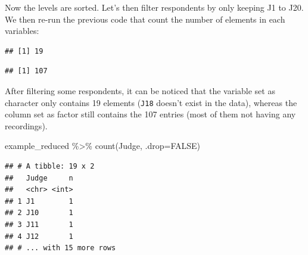 \documentclass[
]{krantz}
\makeatletter
\newenvironment{Shaded}{\begin{snugshade}}{\end{snugshade}}
\newcommand{\AttributeTok}[1]{\textcolor[rgb]{0.61,0.61,0.61}{#1}}
\newcommand{\CommentTok}[1]{\textcolor[rgb]{0.37,0.37,0.37}{\textit{#1}}}
\newcommand{\ConstantTok}[1]{\textcolor[rgb]{0,0,0}{#1}}
\newcommand{\DecValTok}[1]{\textcolor[rgb]{0.06,0.06,0.06}{#1}}
\newcommand{\FunctionTok}[1]{\textcolor[rgb]{0,0,0}{#1}}
\newcommand{\NormalTok}[1]{#1}
\newcommand{\OtherTok}[1]{\textcolor[rgb]{0.37,0.37,0.37}{#1}}
\newcommand{\SpecialCharTok}[1]{\textcolor[rgb]{0,0,0}{#1}}
\newcommand{\StringTok}[1]{\textcolor[rgb]{0.5,0.5,0.5}{#1}}
\newenvironment{kframe}{%
\medskip{}
\setlength{\fboxsep}{.8em}
 \def\at@end@of@kframe{}%
 \ifinner\ifhmode%
  \def\at@end@of@kframe{\end{minipage}}%
  \begin{minipage}{\columnwidth}%
 \fi\fi%
 \def\FrameCommand##1{\hskip\@totalleftmargin \hskip-\fboxsep
 \colorbox{shadecolor}{##1}\hskip-\fboxsep
     \hskip-\linewidth \hskip-\@totalleftmargin \hskip\columnwidth}%
 \MakeFramed {\advance\hsize-\width
   \@totalleftmargin\z@ \linewidth\hsize
   \@setminipage}}%
 {\par\unskip\endMakeFramed%
 \at@end@of@kframe}
\renewenvironment{Shaded}{\begin{kframe}}{\end{kframe}}
\makeatother
\begin{document}
Now the levels are sorted. Let's then filter respondents by only keeping J1 to J20. We then re-run the previous code that count the number of elements in each variables:

\begin{Shaded}
\end{Shaded}

\begin{verbatim}
## [1] 19
\end{verbatim}

\begin{Shaded}
\end{Shaded}

\begin{verbatim}
## [1] 107
\end{verbatim}

After filtering some respondents, it can be noticed that the variable set as character only contains 19 elements (\texttt{J18} doesn't exist in the data), whereas the column set as factor still contains the 107 entries (most of them not having any recordings).

\begin{Shaded}
\begin{Highlighting}[]
\NormalTok{example\_reduced }\SpecialCharTok{\%\textgreater{}\%} 
  \FunctionTok{count}\NormalTok{(Judge, }\AttributeTok{.drop=}\ConstantTok{FALSE}\NormalTok{)}
\end{Highlighting}
\end{Shaded}

\begin{verbatim}
## # A tibble: 19 x 2
##   Judge     n
##   <chr> <int>
## 1 J1        1
## 2 J10       1
## 3 J11       1
## 4 J12       1
## # ... with 15 more rows
\end{verbatim}
\end{document}
